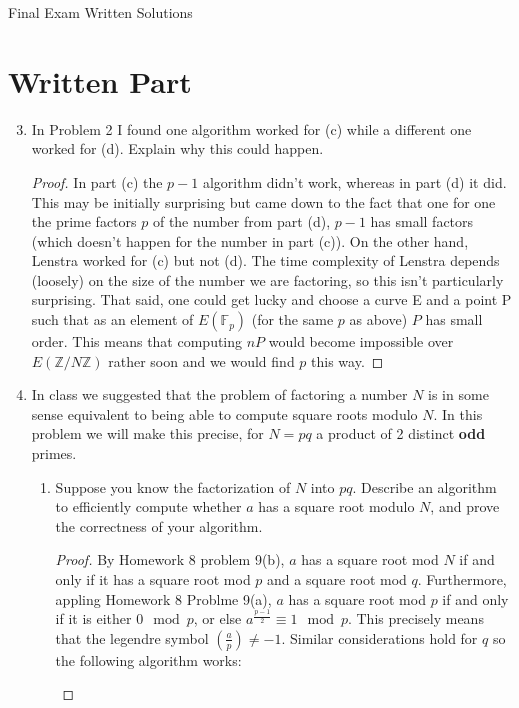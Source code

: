\documentclass[11pt]{article}
\newcommand{\bF}{\mathbb{F}}
\newcommand{\bZ}{\mathbb{Z}}
\begin{document}
\begin{center}
\Large {Final Exam Written Solutions}\\
\end{center}
\section*{Written Part}
\begin{enumerate}
  \setcounter{enumi}{2}
  \item{
  In Problem 2 I found one algorithm worked for (c) while a different one worked for (d).  Explain why this could happen.
  }
  \begin{proof}
    In part (c) the $p-1$ algorithm didn't work, whereas in part (d) it did.  This may be initially surprising but came down to the fact that one for one the prime factors $p$ of the number from part (d), $p-1$ has small factors (which doesn't happen for the number in part (c)).  On the other hand, Lenstra worked for (c) but not (d).  The time complexity of Lenstra depends (loosely) on the size of the number we are factoring, so this isn't particularly surprising.  That said, one could get lucky and choose a curve E and a point P such that as an element of $E(\bF_p)$ (for the same $p$ as above) $P$ has small order.  This means that computing $nP$ would become impossible over $E(\bZ/N\bZ)$ rather soon and we would find $p$ this way.
  \end{proof}
  \item{
  In class we suggested that the problem of factoring a number $N$ is in some sense equivalent to being able to compute square roots modulo $N$.  In
  this problem we will make this precise, for $N=pq$ a product of 2 distinct \textbf{odd} primes.
  \begin{enumerate}
    \item{
    Suppose you know the factorization of $N$ into $pq$.  Describe an algorithm to efficiently compute whether $a$ has a square root modulo $N$, and prove the correctness of your algorithm.
    }
    \begin{proof}
      By Homework 8 problem 9(b), $a$ has a square root mod $N$ if and only if it has a square root mod $p$ and a square root mod $q$.  Furthermore, appling Homework 8 Problme 9(a), $a$ has a square root mod $p$ if and only if it is either 0$\mod p$, or else $a^{\frac{p-1}{2}}\equiv1\mod p$.  This precisely means that the legendre symbol $\left(\frac{a}{p}\right)\not=-1$.  Similar considerations hold for $q$ so the following algorithm works:
      \begin{enumerate}[(1)]

\end{enumerate}
\end{proof}
\end{enumerate}}
\end{enumerate}
\end{document}
